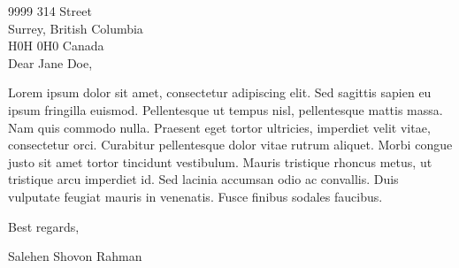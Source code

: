




\thispagestyle{empty}

  

  \vspace{20pt}

  9999 314 Street\\
  Surrey, British Columbia\\
  H0H 0H0 Canada\\

  Dear Jane Doe,

  Lorem ipsum dolor sit amet, consectetur adipiscing elit. Sed sagittis sapien eu ipsum fringilla euismod. Pellentesque ut tempus nisl, pellentesque mattis massa. Nam quis commodo nulla. Praesent eget tortor ultricies, imperdiet velit vitae, consectetur orci. Curabitur pellentesque dolor vitae rutrum aliquet. Morbi congue justo sit amet tortor tincidunt vestibulum. Mauris tristique rhoncus metus, ut tristique arcu imperdiet id. Sed lacinia accumsan odio ac convallis. Duis vulputate feugiat mauris in venenatis. Fusce finibus sodales faucibus.

  Best regards,

  Salehen Shovon Rahman


